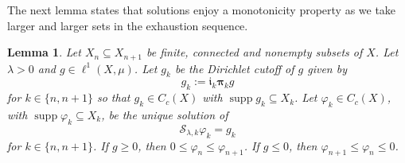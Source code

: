 \documentclass[letterpaper]{article}
\newtheorem{lemma}{Lemma}[section]
\theoremstyle{definition}
\theoremstyle{named}
\numberwithin{equation}{section}
\begin{document}
The next lemma states that solutions enjoy a monotonicity property
as we take larger and larger sets in the exhaustion sequence.
\begin{lemma}\label{lem:monotone-resolvent}
Let $X_n\subseteq X_{n+1}$ be finite, connected and nonempty subsets of $X$.
Let $\lambda>0$ and $g\in \ell^1(X,\mu)$. Let $g_k$ be the Dirichlet cutoff of $g$
given by
\[
g_k:=\boldsymbol{\mathfrak i}_k\boldsymbol{\pi}_k g
\]
for $k \in \{n, n+1\}$
so that $g_k\in C_c(X)$ with $\operatorname{supp}g_k\subseteq X_k$. 
Let $\varphi_k\in C_c(X)$, with $\operatorname{supp}\varphi_k \subseteq X_k$, be the unique solution of
\[
\mathcal{S}_{\lambda,k}\varphi_k=g_k
\]
for $k\in\{ n,n+1\}$.
If $g\ge 0$, then $0\le \varphi_n \le \varphi_{n+1}$. If $g\le 0$, then
$\varphi_{n+1} \le \varphi_{n} \le 0$.
\end{lemma}
\end{document}
